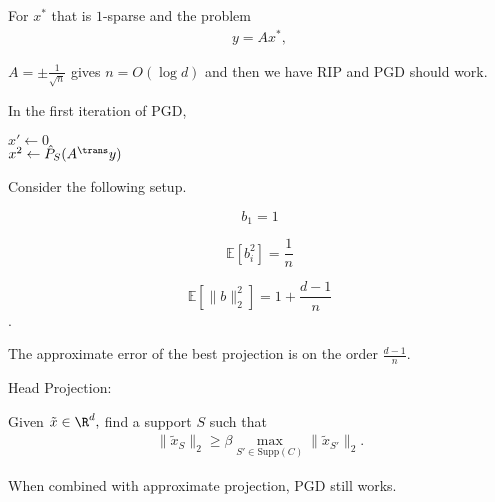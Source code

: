 For $x^*$ that is $1$-sparse and the problem
\begin{align*}
y = Ax^*,
\end{align*}

$A = \pm \frac{1}{\sqrt{n}}$ gives $n= O(\log d)$ and then we have RIP and PGD should work. 

In the first iteration of PGD, 
\begin{center}
$x' \leftarrow 0$ \\
$x^2 \leftarrow \hat{P}_S(A^{\trans} y)$
\end{center}


Consider the following setup. 

$$b_1 = 1$$

$$\mathbb{E}[b_i^2] = \frac{1}{n}$$

$$\mathbb{E}[ \|b \|_2^2] = 1 + \frac{d-1}{n}$$.


The approximate error of the best projection is on the order $\frac{d-1}{n}$.

\begin{definition}
Head Projection:

Given $\tilde{x} \in \R^d,$ find a support $S$ such that
\begin{align}
\| \tilde{x}_S \|_2 \geq \beta \max_{S' \in \text{Supp}(C)} \| \tilde{x}_{S'} \|_2.
\end{align}
\end{definition}

When combined with approximate projection, PGD still works.

